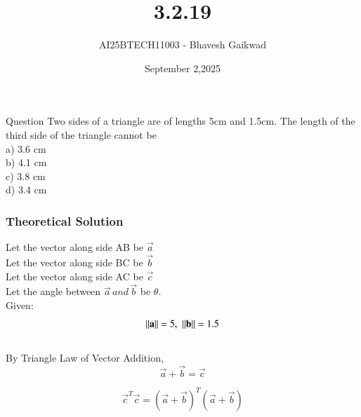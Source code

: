 \documentclass{beamer}
\title
{3.2.19}
\date{September 2,2025}
\author 
{AI25BTECH11003 - Bhavesh Gaikwad}
\begin{document}
\frame{\titlepage}
\begin{frame}{Question}
Two sides of a triangle are of lengths 5cm and 1.5cm. The length of the third side of the triangle cannot be\\
a) 3.6 cm\\
b) 4.1 cm\\
c) 3.8 cm\\
d) 3.4 cm\\
\end{frame}


\begin{frame}[fragile]
    \frametitle{Theoretical Solution}
    Let the vector along side AB be $\vec{a}$ \\
Let the vector along side BC be $\vec{b}$ \\
Let the vector along side AC be $\vec{c}$ \\
Let the angle between $\vec{a} \, and \, \vec{b}$ be $\theta$.\\

Given: 
\begin{equation}
    \left\lVert\mathbf{a}\right\rVert = 5, \, \, \left\lVert\mathbf{b}\right\rVert = 1.5
\end{equation}\\

By Triangle Law of Vector Addition,
\begin{equation}
    \vec{a} + \vec{b} = \vec{c}
\end{equation}

\begin{equation}
\vec{c}^T\vec{c} = (\vec{a}+\vec{b})^T(\vec{a}+\vec{b})    
\end{equation}
\end{frame}
\end{document}

